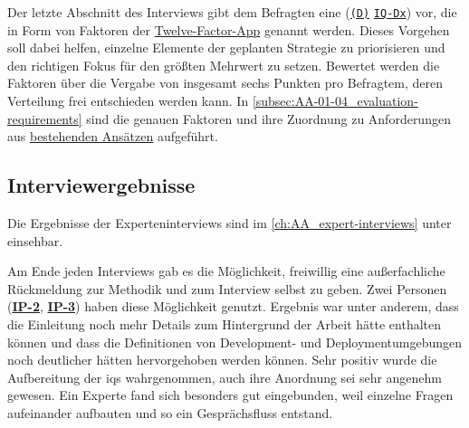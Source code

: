Der letzte Abschnitt des Interviews gibt dem Befragten eine \textbf{} (\texttt{\hyperref[subsubsec:04-01-02-02_form]{(D)}} \textrightarrow \texttt{\hyperref[subsec:AA-01-04_evaluation-requirements]{IQ-Dx}}) vor, die in Form von Faktoren der \hyperref[sec:03-05_concept-of-twelve-factor-app]{Twelve-Factor-App} genannt werden. Dieses Vorgehen soll dabei helfen, einzelne Elemente der geplanten  Strategie zu priorisieren und den richtigen Fokus für den größten Mehrwert zu setzen. Bewertet werden die Faktoren über die Vergabe von insgesamt sechs Punkten pro Befragtem, deren Verteilung frei entschieden werden kann. In \autoref{subsec:AA-01-04_evaluation-requirements} sind die genauen Faktoren und ihre Zuordnung zu Anforderungen aus \hyperref[ch:03_examination-of-existing-approaches]{bestehenden Ansätzen} aufgeführt.

\subsection{Interviewergebnisse}
\label{subsec:04-01-04_interview-results}

Die Ergebnisse der Experteninterviews sind im \autoref{ch:AA_expert-interviews} unter  einsehbar.

Am Ende jeden Interviews gab es die Möglichkeit, freiwillig eine außerfachliche Rückmeldung zur Methodik und zum Interview selbst zu geben. Zwei Personen (\textbf{\hyperref[sec:AA-02_interview-persons]{IP-2}}, \textbf{\hyperref[sec:AA-02_interview-persons]{IP-3}}) haben diese Möglichkeit genutzt. Ergebnis war unter anderem, dass die Einleitung noch mehr Details zum Hintergrund der Arbeit hätte enthalten können und dass die Definitionen von Development- und Deploymentumgebungen noch deutlicher hätten hervorgehoben werden können. Sehr positiv wurde die Aufbereitung der \Glspl{iq} wahrgenommen, auch ihre Anordnung sei sehr angenehm gewesen. Ein Experte fand sich besonders gut eingebunden, weil einzelne Fragen aufeinander aufbauten und so ein Gesprächsfluss entstand.

